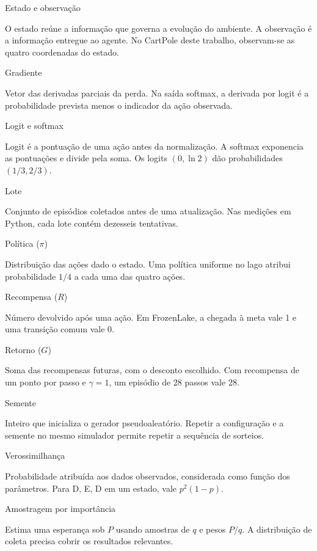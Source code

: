 Estado e observação

O estado reúne a informação que governa a evolução do ambiente. A observação é a informação entregue ao agente. No CartPole deste trabalho, observam-se as quatro coordenadas do estado.

Gradiente

Vetor das derivadas parciais da perda. Na saída softmax, a derivada por logit é a probabilidade prevista menos o indicador da ação observada.

Logit e softmax

Logit é a pontuação de uma ação antes da normalização. A softmax exponencia as pontuações e divide pela soma. Os logits $(0,\ln 2)$ dão probabilidades $(1/3,2/3)$.

Lote

Conjunto de episódios coletados antes de uma atualização. Nas medições em Python, cada lote contém dezesseis tentativas.

Política ($\pi$)

Distribuição das ações dado o estado. Uma política uniforme no lago atribui probabilidade $1/4$ a cada uma das quatro ações.

Recompensa ($R$)

Número devolvido após uma ação. Em FrozenLake, a chegada à meta vale 1 e uma transição comum vale 0.

Retorno ($G$)

Soma das recompensas futuras, com o desconto escolhido. Com recompensa de um ponto por passo e $\gamma=1$, um episódio de 28 passos vale 28.

Semente

Inteiro que inicializa o gerador pseudoaleatório. Repetir a configuração e a semente no mesmo simulador permite repetir a sequência de sorteios.

Verossimilhança

Probabilidade atribuída aos dados observados, considerada como função dos parâmetros. Para D, E, D em um estado, vale $p^2(1-p)$.

Amostragem por importância

Estima uma esperança sob $P$ usando amostras de $q$ e pesos $P/q$. A distribuição de coleta precisa cobrir os resultados relevantes.

